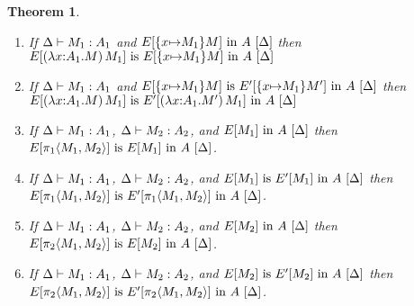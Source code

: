 \documentclass{article}
\theoremstyle{break}
\newtheorem{theorem}{Theorem}
\begin{document}
\begin{theorem}
\label{thm:weakheadclosure}
\begin{enumerate}
\item
If $\Delta\vdash M_1 : A_1$ and
${E[\{x{\mapsto}M_1\}{M}]}\mathrm{\ in\ }{A}\ [\Delta]$
then 
${E[(\lambda x{:}A_1.M)\,M_1]}\mathrm{\ is\ }{E[\{x{\mapsto}M_1\}{M}]}\mathrm{\ in\ }{A}\ [\Delta]$
\item
If $\Delta\vdash M_1 : A_1$ and
${E[\{x{\mapsto}M_1\}{M}]}\mathrm{\ is\ }{E'[\{x{\mapsto}M_1\}{M'}]}\mathrm{\ in\ }{A}\ [\Delta]$
then 
${E[(\lambda x{:}A_1.M)\,M_1]}\mathrm{\ is\ }{E'[(\lambda x{:}A_1.M')\,M_1]}\mathrm{\ in\ }{A}\ [\Delta]$
\item
If $\Delta\vdash M_1 : A_1$, 
$\Delta\vdash M_2 : A_2$, and
${E[M_1]}\mathrm{\ in\ }{A}\ [\Delta]$
then 
${E[{\pi_{1}}{\langle{M_1},{M_2}\rangle}]}\mathrm{\ is\ }{E[M_1]}\mathrm{\ in\ }{A}\ [\Delta]$.
\item
If $\Delta\vdash M_1 : A_1$, 
$\Delta\vdash M_2 : A_2$, and
${E[M_1]}\mathrm{\ is\ }{E'[M_1]}\mathrm{\ in\ }{A}\ [\Delta]$
then 
${E[{\pi_{1}}{\langle{M_1},{M_2}\rangle}]}\mathrm{\ is\ }{E'[{\pi_{1}}{\langle{M_1},{M_2}\rangle}]}\mathrm{\ in\ }{A}\ [\Delta]$.
\item
If $\Delta\vdash M_1 : A_1$, 
$\Delta\vdash M_2 : A_2$, and
${E[M_2]}\mathrm{\ in\ }{A}\ [\Delta]$
then 
${E[{\pi_{2}}{\langle{M_1},{M_2}\rangle}]}\mathrm{\ is\ }{E[M_2]}\mathrm{\ in\ }{A}\ [\Delta]$.
\item
If $\Delta\vdash M_1 : A_1$, 
$\Delta\vdash M_2 : A_2$, and
${E[M_2]}\mathrm{\ is\ }{E'[M_2]}\mathrm{\ in\ }{A}\ [\Delta]$
then 
${E[{\pi_{2}}{\langle{M_1},{M_2}\rangle}]}\mathrm{\ is\ }{E'[{\pi_{2}}{\langle{M_1},{M_2}\rangle}]}\mathrm{\ in\ }{A}\ [\Delta]$.
\end{enumerate}
\end{theorem}
\end{document}

